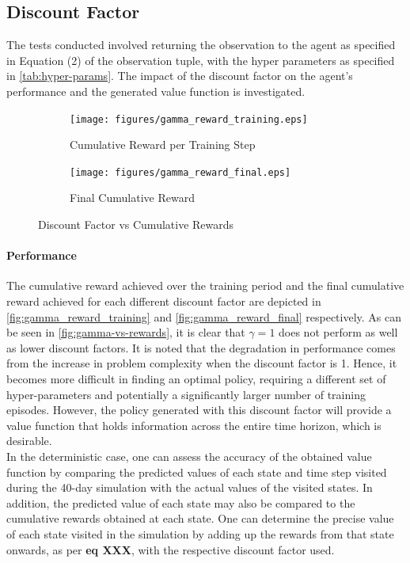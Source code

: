 \subsection{Discount Factor}
The tests conducted involved returning the observation to the agent as specified in Equation (2) of the observation tuple, with the hyper parameters as specified in \autoref{tab:hyper-params}. The impact of the discount factor on the agent's performance and the generated value function is investigated. 

\begin{figure}
     \centering
     \begin{subfigure}[b]{0.49\textwidth}
         \centering
         \texttt{[image: figures/gamma\_reward\_training.eps]}
         \caption{Cumulative Reward per Training Step}
         \label{fig:gamma_reward_training}
     \end{subfigure}
     \begin{subfigure}[b]{0.49\textwidth}
         \centering
         \texttt{[image: figures/gamma\_reward\_final.eps]}
         \caption{Final Cumulative Reward}
         \label{fig:gamma_reward_final}
     \end{subfigure}
        \caption{Discount Factor vs Cumulative Rewards}
        \label{fig:gamma-vs-rewards}
\end{figure}

\paragraph{Performance} 
The cumulative reward achieved over the training period and the final cumulative reward achieved for each different discount factor are depicted in \autoref{fig:gamma_reward_training} and \autoref{fig:gamma_reward_final} respectively.
As can be seen in \autoref{fig:gamma-vs-rewards}, it is clear that $\gamma = 1$ does not perform as well as lower discount factors. It is noted that the degradation in performance comes from the increase in problem complexity when the discount factor is 1. Hence, it becomes more difficult in finding an optimal policy, requiring a different set of hyper-parameters and potentially a significantly larger number of training episodes. However, the policy generated with this discount factor will provide a value function that holds information across the entire time horizon, which is desirable. \\
In the deterministic case, one can assess the accuracy of the obtained value function by comparing the predicted values of each state and time step visited during the 40-day simulation with the actual values of the visited states. In addition, the predicted value of each state may also be compared to the cumulative rewards obtained at each state. One can determine the precise value of each state visited in the simulation by adding up the rewards from that state onwards, as per \textbf{eq XXX}, with the respective discount factor used.

